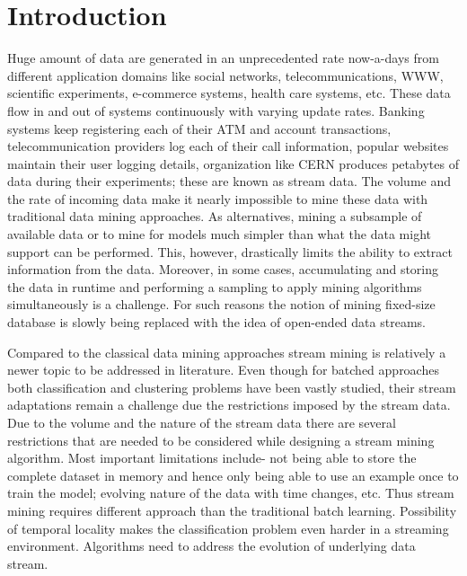 \chapter{Introduction}
\label{chp:intro}
Huge amount of data are generated in an unprecedented rate now-a-days from different application domains like social networks, telecommunications, WWW, scientific experiments, e-commerce systems, health care systems, etc. These data flow in and out of systems continuously with varying update rates. Banking systems keep registering each of their ATM and account transactions, telecommunication providers log each of their call information, popular websites maintain their user logging details, organization like CERN produces petabytes of data during their experiments; these are known as stream data. The volume and the rate of incoming data make it nearly impossible to mine these data with traditional data mining approaches. As alternatives, mining a subsample of available data or to mine for models much simpler than what the data might support can be performed. This, however, drastically limits the ability to extract information from the data. Moreover, in some cases, accumulating and storing the data in runtime and performing a sampling to apply mining algorithms simultaneously is a challenge. For such reasons the notion of mining fixed-size database is slowly being replaced with the idea of open-ended data streams.

Compared to the classical data mining approaches stream mining is relatively a newer topic to be addressed in literature. Even though for batched approaches both classification and clustering problems have been vastly studied, their stream adaptations remain a challenge due the restrictions imposed by the stream data. Due to the volume and the nature of the stream data there are several restrictions that are needed to be considered while designing a stream mining algorithm. Most important limitations include- not being able to store the complete dataset in memory and hence only being able to use an example once to train the model; evolving nature of the data with time changes, etc. Thus stream mining requires different approach than the traditional batch learning. Possibility of temporal locality makes the classification problem even harder in a streaming environment. Algorithms need to address the evolution of underlying data stream.

